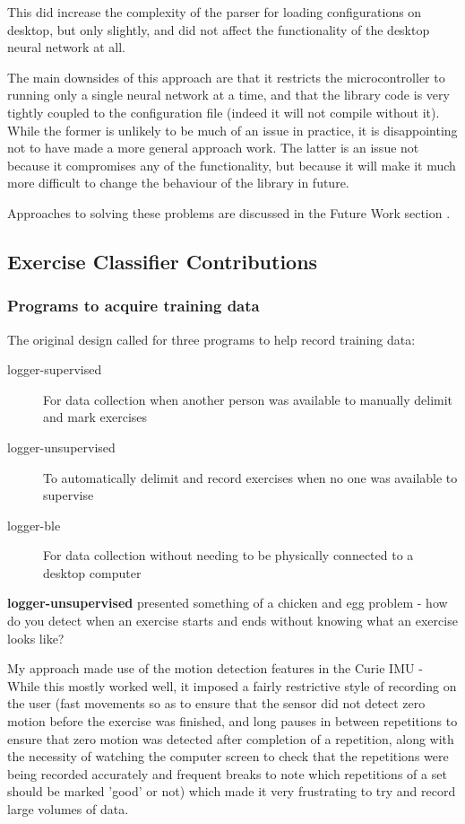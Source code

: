 \documentclass[a4paper]{article}
\begin{document}
This did increase the complexity of the parser for loading configurations on desktop, but only slightly, and did not affect the functionality of the desktop neural network at all.

The main downsides of this approach are that it restricts the microcontroller to running only a single neural network at a time, and that the library code is very tightly coupled to the configuration file (indeed it will not compile without it). While the former is unlikely to be much of an issue in practice, it is disappointing not to have made a more general approach work.
The latter is an issue not because it compromises any of the functionality, but because it will make it much more difficult to change the behaviour of the library in future. 

Approaches to solving these problems are discussed in the Future Work section .

\subsection{Exercise Classifier Contributions}%

\subsubsection{Programs to acquire training data}

The original design called for three programs to help record training data:


\begin{description}
\item[logger-supervised] For data collection when another person was available to manually delimit and mark exercises
\item[logger-unsupervised] To automatically delimit and record exercises when no one was available to supervise
\item[logger-ble] For data collection without needing to be physically connected to a desktop computer
\end{description}

\textbf{logger-unsupervised} presented something of a chicken and egg problem - how do you detect when an exercise starts and ends without knowing what an exercise looks like?

My approach made use of the motion detection features in the Curie IMU - 
While this mostly worked well, it imposed a fairly restrictive style of recording on the user (fast movements so as to ensure that the sensor did not detect zero motion before the exercise was finished, and long pauses in between repetitions to ensure that zero motion was detected after completion of a repetition, along with the necessity of watching the computer screen to check that the repetitions were being recorded accurately and frequent breaks to note which repetitions of a set should be marked 'good' or not) which made it very frustrating to try and record large volumes of data.
\end{document}
